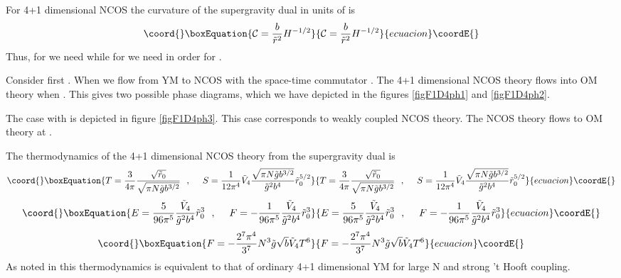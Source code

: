 \documentclass[a4paper,twoside,titlepage,12pt]{article}
\begin{document}
For 4+1 dimensional NCOS the curvature 
of the supergravity dual in units of \coordHE{} is \cite{Harmark:2000wv}
%
\begin{equation}\coord{}\boxEquation{
\mathcal{C} = \frac{b}{\tilde{r}^2} H^{-1/2}
}{
\mathcal{C} = \frac{b}{\tilde{r}^2} H^{-1/2}
}{ecuacion}\coordE{}\end{equation}
%
Thus, for \coordHE{} we 
need \coordHE{}
while for \coordHE{} we need \coordHE{}
in order for \coordHE{}.

Consider first \coordHE{}.
When \coordHE{} we flow from YM to NCOS with the space-time
commutator \coordHE{}. 
The 4+1 dimensional NCOS theory flows into OM theory when
\coordHE{}.
This gives two possible phase diagrams, which we have depicted
in the figures \ref{figF1D4ph1} and \ref{figF1D4ph2}.

The case with \coordHE{} is depicted in figure \ref{figF1D4ph3}.
This case corresponds to weakly coupled NCOS theory.
The NCOS theory flows to OM theory at \coordHE{}.



The thermodynamics of the 4+1 dimensional NCOS theory 
from the supergravity dual
is \cite{Harmark:2000wv}
%
\begin{equation}\coord{}\boxEquation{
T = \frac{3}{4\pi}\frac{\sqrt{\tilde{r}_0}}{\sqrt{\pi N \tilde{g} b^{3/2}}}
\spa
S = \frac{1}{12 \pi^4} \tilde{V}_4 
\frac{\sqrt{\pi N \tilde{g} b^{3/2}}}{\tilde{g}^2 b^4 }
\tilde{r}_0^{5/2} 
}{
T = \frac{3}{4\pi}\frac{\sqrt{\tilde{r}_0}}{\sqrt{\pi N \tilde{g} b^{3/2}}}
\spa
S = \frac{1}{12 \pi^4} \tilde{V}_4 
\frac{\sqrt{\pi N \tilde{g} b^{3/2}}}{\tilde{g}^2 b^4 }
\tilde{r}_0^{5/2} 
}{ecuacion}\coordE{}\end{equation}
\begin{equation}\coord{}\boxEquation{
E = \frac{5}{96 \pi^5} \frac{\tilde{V}_4}{\tilde{g}^2 b^4} \tilde{r}_0^3
\spa
F = - \frac{1}{96 \pi^5} \frac{\tilde{V}_4}{\tilde{g}^2 b^4} \tilde{r}_0^3
}{
E = \frac{5}{96 \pi^5} \frac{\tilde{V}_4}{\tilde{g}^2 b^4} \tilde{r}_0^3
\spa
F = - \frac{1}{96 \pi^5} \frac{\tilde{V}_4}{\tilde{g}^2 b^4} \tilde{r}_0^3
}{ecuacion}\coordE{}\end{equation}
\begin{equation}\coord{}\boxEquation{
F= - \frac{2^7 \pi^4}{3^7} N^3 \tilde{g} \sqrt{b} \tilde{V}_4 T^6
}{
F= - \frac{2^7 \pi^4}{3^7} N^3 \tilde{g} \sqrt{b} \tilde{V}_4 T^6
}{ecuacion}\coordE{}\end{equation}
%
As noted in \cite{Harmark:2000wv} this thermodynamics is equivalent
to that of ordinary 4+1 dimensional YM for large N and strong 't Hooft
coupling.
\end{document}
